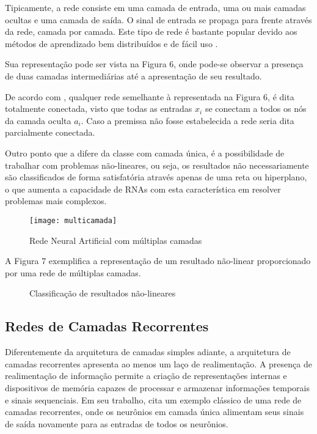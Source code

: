Tipicamente, a rede consiste em uma camada de entrada, uma ou mais camadas ocultas e uma camada de saída. O sinal de entrada se propaga para frente através da rede, camada por camada. Este tipo de rede é bastante popular devido aos métodos de aprendizado bem distribuídos e de fácil uso \cite{haykin2000}.

Sua representação pode ser vista na Figura 6, onde pode-se observar a presença de duas camadas intermediárias até a apresentação de seu resultado.

De acordo com , qualquer rede semelhante à representada na Figura 6, é dita totalmente conectada, visto que todas as entradas $x_i$ se conectam a todos os nós da camada oculta $a_i$. Caso a premissa não fosse estabelecida a rede seria dita parcialmente conectada.

Outro ponto que a difere da classe com camada única, é a possibilidade de trabalhar com problemas não-lineares, ou seja, os resultados não necessariamente são classificados de forma satisfatória através apenas de uma reta ou hiperplano, o que aumenta a capacidade de RNAs com esta característica em resolver problemas mais complexos.

\begin{figure}[h]
	\centering
	\texttt{[image: multicamada]}
	\caption{Rede Neural Artificial com múltiplas camadas}
	\label{fig-multiplas-camadas}
\end{figure}

A Figura 7 exemplifica a representação de um resultado não-linear proporcionado por uma rede de múltiplas camadas.

\begin{figure}[h]
	\centering
	\caption{Classificação de resultados não-lineares}
	\label{exec-nao-linear-imagem}
\end{figure}

\subsection{Redes de Camadas Recorrentes}
Diferentemente da arquitetura de camadas simples adiante, a arquitetura de camadas recorrentes apresenta ao menos um laço de realimentação. A presença de realimentação de informação permite a criação de representações internas e dispositivos de memória capazes de processar e armazenar informações temporais e sinais sequenciais. Em seu trabalho,  cita um exemplo clássico de uma rede de camadas recorrentes, onde os neurônios em camada única alimentam seus sinais de saída novamente para as entradas de todos os neurônios.

